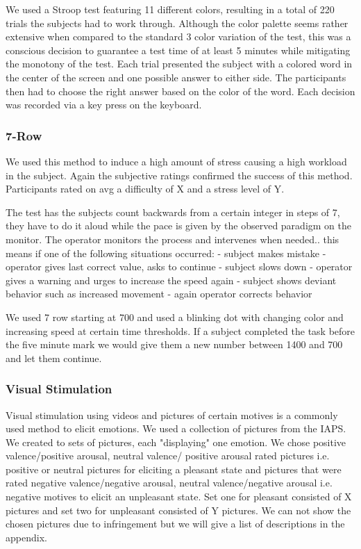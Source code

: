 We used a Stroop test featuring 11 different colors, resulting in a total of 220 trials the subjects had to work through. Although the color palette seems rather extensive when compared to the standard 3 color variation of the test, this was a conscious decision to guarantee a test time of at least 5 minutes while mitigating the monotony of the test. Each trial presented the subject with a colored word in the center of the screen and one possible answer to either side. The participants then had to choose the right answer based on the color of the word. Each decision was recorded via a key press on the keyboard. 

\subsubsection{7-Row}
We used this method to induce a high amount of stress causing a high workload in the subject. Again the subjective ratings confirmed the success of this method. Participants rated on avg a difficulty of X and a stress level of Y.

The test has the subjects count backwards from a certain integer in steps of 7, they have to do it aloud while the pace is given by the observed paradigm on the monitor. The operator monitors the process and intervenes when needed.. this means if one of the following situations occurred: 
- subject makes mistake - operator gives last correct value, asks to continue
- subject slows down - operator gives a warning and urges to increase the speed again
- subject shows deviant behavior such as increased movement - again operator corrects behavior

We used 7 row starting at 700 and used a blinking dot with changing color and increasing speed at certain time thresholds. If a subject completed the task before the five minute mark we would give them a new number between 1400 and 700 and let them continue.

\subsubsection{Visual Stimulation}
Visual stimulation using videos and pictures of certain motives is a commonly used method to elicit emotions. We used a collection of pictures from the IAPS.
We created to sets of pictures, each "displaying" one emotion. We chose positive valence/positive arousal, neutral valence/ positive arousal rated pictures i.e. positive or neutral pictures for eliciting a pleasant state and pictures that were rated negative valence/negative arousal, neutral valence/negative arousal i.e. negative motives to elicit an unpleasant state.
Set one for pleasant consisted of X pictures and set two for unpleasant consisted of Y pictures.
We can not show the chosen pictures due to infringement but we will give a list of descriptions in the appendix.
